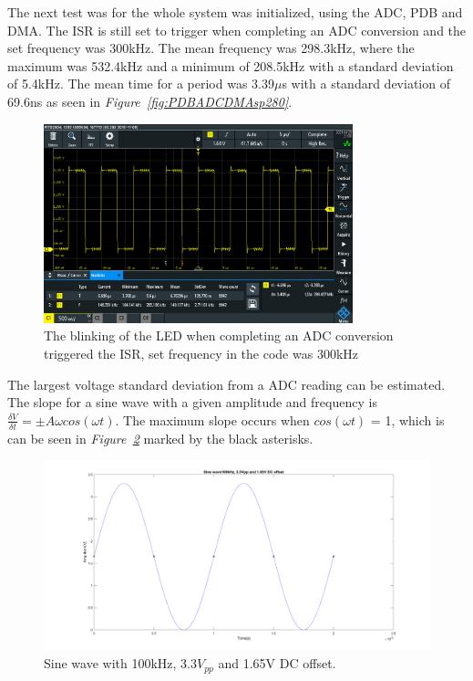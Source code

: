 The next test was for the whole system was initialized, using the ADC, PDB and DMA.
The ISR is still set to trigger when completing an ADC conversion and the set frequency was 300kHz.
The mean frequency was 298.3kHz, where the maximum was 532.4kHz and a minimum of 208.5kHz with a standard deviation of 5.4kHz. 
The mean time for a period was 3.39$\mu$s with a standard deviation of 69.6ns as seen in \textit{Figure~\ref{fig:PDBADCDMAsp280}}.

\begin{figure}[h]
    \centering
    \includegraphics[width=0.8\textwidth]{graphics/ALLT300k.PNG}
    \caption{The blinking of the LED when completing an ADC conversion triggered the ISR, set frequency in the code was 300kHz}
    \label{fig:PDBADCDMAsp300}
\end{figure}

The largest voltage standard deviation from a ADC reading can be estimated.
The slope for a sine wave with a given amplitude and frequency is $\frac{\delta V}{\delta t} = \pm A\omega cos(\omega t)$.
The maximum slope occurs when $cos(\omega t)$ = 1, which is can be seen in \textit{Figure~\ref{fig:sine100k}} marked by the black asterisks.

\begin{figure}[h]
    \centering
    \includegraphics[width=1.0\textwidth]{graphics/sine100k.png}
    \caption{Sine wave with 100kHz, 3.3$V_{pp}$ and 1.65V DC offset.}
    \label{fig:sine100k}
\end{figure}

